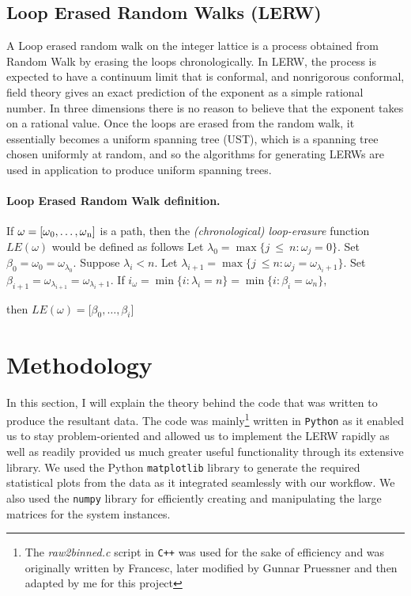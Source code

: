 \documentclass{article}
\begin{document}
\subsection{Loop Erased Random Walks (LERW)}
	A Loop erased random walk on the integer lattice is a process obtained from Random Walk by erasing the loops chronologically. In LERW, the process is expected to have a continuum limit that is conformal, and nonrigorous conformal, field theory gives an exact prediction of the exponent as a simple rational number. In three dimensions there is no reason to believe that the exponent takes on a rational value. Once the loops are erased from the random walk, it essentially becomes a uniform spanning tree (UST), which is a spanning tree chosen uniformly at random, and so the algorithms for generating LERWs are used in application to produce uniform spanning trees.

\paragraph{Loop Erased Random Walk definition.} \label{alg:LE} If $\omega = [\omega\textsubscript{0}, \ldots, \omega\textsubscript{n}]$ is a path, then the \emph{(chronological) loop-erasure} function $LE(\omega)$ would be defined as follows\cite{klafter2011} \newline
	Let $\lambda_{0} = \max\{j\ \le \ n: \omega_{j}=0\}$.
	\newline
	Set $\beta_{0}=\omega_{0}=\omega_{\lambda_{0}}$.
	\newline
	Suppose $\lambda_{i} < n$. Let $\lambda_{i+1} = \max\{j\ \le n: \omega_{j}=\omega_{\lambda_{i}+1}\}$.
	\newline
	Set $\beta_{i+1}=\omega_{\lambda_{i+1}}=\omega_{\lambda_{i}+1}$.
	\newline
	If $i_{\omega} = \min \{i : \lambda_{i} = n\} = \min\{i : \beta_{i} = \omega_{n}\}$,

	then $LE\left(\omega\right) = \lbrack \beta_{0},\ldots,\beta_{i}\rbrack$

\section{Methodology}
	In this section, I will explain the theory behind the code that was written to produce the resultant data. The code was mainly\footnote{The \emph{raw2binned.c} script in \texttt{C++} was used for the sake of efficiency and was originally written by Francesc, later modified by Gunnar Pruessner and then adapted by me for this project} written in \texttt{Python} as it enabled us to stay problem-oriented and allowed us to implement the LERW rapidly as well as readily provided us much greater useful functionality through its extensive library. We used the Python \texttt{matplotlib} library to generate the required statistical plots from the data as it integrated seamlessly with our workflow. We also used the  \texttt{numpy} library for efficiently creating and manipulating the large matrices for the system instances.
\end{document}
